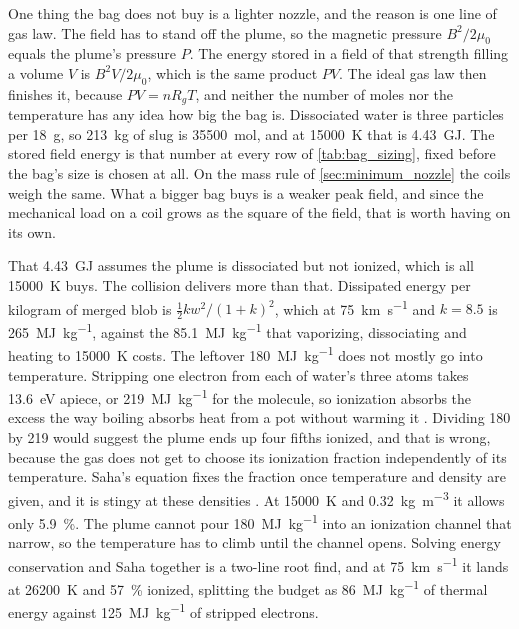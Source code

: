 \documentclass{article}
\begin{document}
One thing the bag does not buy is a lighter nozzle, and the reason is one line of gas law. The field has to stand off the plume, so the magnetic pressure $B^2/2\mu_0$ equals the plume's pressure $P$. The energy stored in a field of that strength filling a volume $V$ is $B^2V/2\mu_0$, which is the same product $PV$. The ideal gas law then finishes it, because $PV = nR_gT$, and neither the number of moles nor the temperature has any idea how big the bag is. Dissociated water is three particles per \SI{18}{\gram}, so \SI{213}{\kilogram} of slug is \SI{35500}{\mole}, and at \SI{15000}{\kelvin} that is \SI{4.43}{\giga\joule}. The stored field energy is that number at every row of \autoref{tab:bag_sizing}, fixed before the bag's size is chosen at all. On the mass rule of \autoref{sec:minimum_nozzle} the coils weigh the same. What a bigger bag buys is a weaker peak field, and since the mechanical load on a coil grows as the square of the field, that is worth having on its own.

That \SI{4.43}{\giga\joule} assumes the plume is dissociated but not ionized, which is all \SI{15000}{\kelvin} buys. The collision delivers more than that. Dissipated energy per kilogram of merged blob is $\tfrac{1}{2}kw^2/(1+k)^2$, which at \SI{75}{\kilo\meter\per\second} and $k = 8.5$ is \SI{265}{\mega\joule\per\kilogram}, against the \SI{85.1}{\mega\joule\per\kilogram} that vaporizing, dissociating and heating to \SI{15000}{\kelvin} costs. The leftover \SI{180}{\mega\joule\per\kilogram} does not mostly go into temperature. Stripping one electron from each of water's three atoms takes \SI{13.6}{\electronvolt} apiece, or \SI{219}{\mega\joule\per\kilogram} for the molecule, so ionization absorbs the excess the way boiling absorbs heat from a pot without warming it \cite{zeldovich_raizer}. Dividing \num{180} by \num{219} would suggest the plume ends up four fifths ionized, and that is wrong, because the gas does not get to choose its ionization fraction independently of its temperature. Saha's equation fixes the fraction once temperature and density are given, and it is stingy at these densities \cite{hansen_kawaler_trimble_stellar_interiors}. At \SI{15000}{\kelvin} and \SI{0.32}{\kilogram\per\cubic\meter} it allows only \SI{5.9}{\percent}. The plume cannot pour \SI{180}{\mega\joule\per\kilogram} into an ionization channel that narrow, so the temperature has to climb until the channel opens. Solving energy conservation and Saha together is a two-line root find, and at \SI{75}{\kilo\meter\per\second} it lands at \SI{26200}{\kelvin} and \SI{57}{\percent} ionized, splitting the budget as \SI{86}{\mega\joule\per\kilogram} of thermal energy against \SI{125}{\mega\joule\per\kilogram} of stripped electrons.
\end{document}
